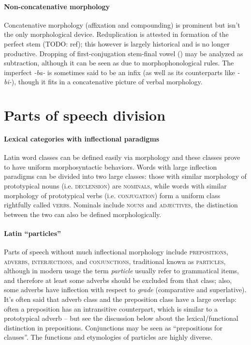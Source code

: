 \documentclass[a4paper, oneside, 12pt]{report}
\newcommand*{\term}[1]{\emph{#1}}
\newcommand{\form}[1]{\emph{#1}}
\newcommand*{\category}[1]{\textsc{#1}}
\begin{document}
\paragraph*{Non-concatenative morphology}

Concatenative morphology (affixation and compounding) 
is prominent but isn't the only morphological device.
Reduplication is attested in 
formation of the perfect stem (TODO: ref);
this however is largely historical 
and is no longer productive.
Dropping of first-conjugation stem-final vowel ()
may be analyzed as subtraction,
although it can be seen as due to morphophonological rules.
The imperfect \form{-ba-} is sometimes said to be an infix 
(as well as its counterparts like \form{-bi-}),
though it fits in a concatenative picture of verbal morphology.

\section{Parts of speech division}

\paragraph*{Lexical categories with inflectional paradigms}

Latin word classes can be defined easily via morphology
and these classes prove to have uniform morphosyntactic behaviors.
Words with large inflection paradigms can be divided into two large classes:
those with similar morphology of prototypical nouns (i.e. \category{declension}) are \category{nominals},
while words with similar morphology of prototypical verbs (i.e. \category{conjugation})
form a uniform class rightfully called \category{verbs}.
Nominals include \category{nouns} and \category{adjectives},
the distinction between the two can also be defined morphologically.

\paragraph*{Latin ``particles''}

Parts of speech without much inflectional morphology include \category{prepositions}, \category{adverbs},
\category{interjections}, and \category{conjunctions},
traditional known as \category{particles}, 
although in modern usage the term \term{particle}
usually refer to grammatical items, 
and therefore at least some adverbs should be excluded from that class;  
also, some adverbs have inflection with respect to \emph{grade} 
(comparative and superlative).
It's often said that adverb class and the preposition class have a large overlap:
often a preposition has an intransitive counterpart,
which is similar to a prototypical adverb -- 
but see the discussion below about the lexical/functional distinction in prepositions.
Conjunctions may be seen as ``prepositions for clauses''.
The functions and etymologies of particles are highly diverse.
\end{document}
